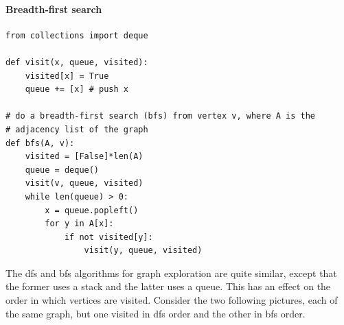 \documentclass[11pt]{article}
\begin{document}
\paragraph{Breadth-first search}

\begin{verbatim}
from collections import deque

def visit(x, queue, visited):
    visited[x] = True
    queue += [x] # push x

# do a breadth-first search (bfs) from vertex v, where A is the
# adjacency list of the graph
def bfs(A, v):
    visited = [False]*len(A)
    queue = deque()
    visit(v, queue, visited)
    while len(queue) > 0:
        x = queue.popleft()
        for y in A[x]:
            if not visited[y]:
                visit(y, queue, visited)
\end{verbatim}

The dfs and bfs algorithms for graph exploration are quite similar,
except that the former uses a stack and the latter uses a queue.  This
has an effect on the order in which vertices are visited.  Consider
the two following pictures, each of the same graph, but one visited in
dfs order and the other in bfs order.
\end{document}
